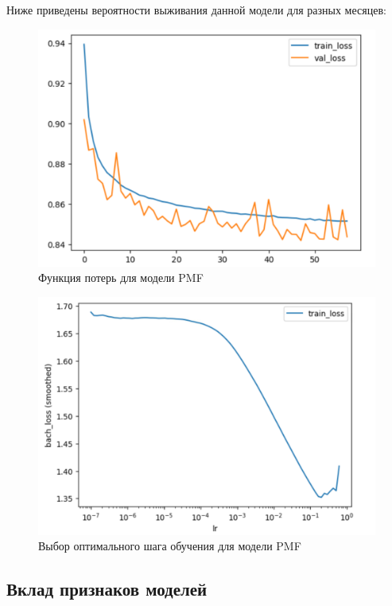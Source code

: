 \documentclass[a4paper,14pt,oneside,openany]{memoir}
\begin{document}
Ниже приведены вероятности выживания данной модели для разных месяцев: 

\begin{figure}[H]
	\includegraphics[width=\textwidth]{../figures/pmf_losses_30_epoch.png}
	\caption{Функция потерь для модели PMF}
\end{figure}

\begin{figure}[H]
	\includegraphics[width=\textwidth]{../figures/pmf_losses_30_epoch_lr.png}
	\caption{Выбор оптимального шага обучения для модели PMF}
\end{figure}

\subsection{Вклад признаков моделей}
\end{document}
